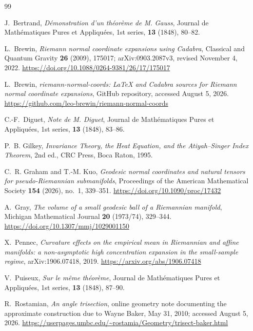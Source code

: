\documentclass[11pt]{amsart}
\numberwithin{equation}{section}
\theoremstyle{remark}
\begin{document}
\begin{thebibliography}{99}

J.~Bertrand,
\emph{D\'emonstration d'un th\'eor\`eme de M. Gauss},
Journal de Math\'ematiques Pures et Appliqu\'ees, 1st series, \textbf{13} (1848), 80--82.

L.~Brewin,
\emph{Riemann normal coordinate expansions using Cadabra},
Classical and Quantum Gravity \textbf{26} (2009), 175017;
arXiv:0903.2087v3, revised November 4, 2022.
\url{https://doi.org/10.1088/0264-9381/26/17/175017}

L.~Brewin,
\emph{riemann-normal-coords: LaTeX and Cadabra sources for Riemann normal coordinate expansions},
GitHub repository, accessed August 5, 2026.
\url{https://github.com/leo-brewin/riemann-normal-coords}

C.-F.~Diguet,
\emph{Note de M. Diguet},
Journal de Math\'ematiques Pures et Appliqu\'ees, 1st series, \textbf{13} (1848), 83--86.

P.~B. Gilkey,
\emph{Invariance Theory, the Heat Equation, and the Atiyah--Singer Index Theorem},
2nd ed., CRC Press, Boca Raton, 1995.

C.~R. Graham and T.-M. Kuo,
\emph{Geodesic normal coordinates and natural tensors for pseudo-Riemannian submanifolds},
Proceedings of the American Mathematical Society \textbf{154} (2026), no.~1, 339--351.
\url{https://doi.org/10.1090/proc/17432}


A.~Gray,
\emph{The volume of a small geodesic ball of a Riemannian manifold},
Michigan Mathematical Journal \textbf{20} (1973/74), 329--344.
\url{https://doi.org/10.1307/mmj/1029001150}

X.~Pennec,
\emph{Curvature effects on the empirical mean in Riemannian and affine manifolds: a non-asymptotic high concentration expansion in the small-sample regime},
arXiv:1906.07418, 2019.
\url{https://arxiv.org/abs/1906.07418}

V.~Puiseux,
\emph{Sur le m\^eme th\'eor\`eme},
Journal de Math\'ematiques Pures et Appliqu\'ees, 1st series, \textbf{13} (1848), 87--90.

R.~Rostamian,
\emph{An angle trisection}, online geometry note documenting the approximate construction due to Wayne Baker, May 31, 2010; accessed August 5, 2026.
\url{https://userpages.umbc.edu/~rostamia/Geometry/trisect-baker.html}

\end{thebibliography}
\end{document}
